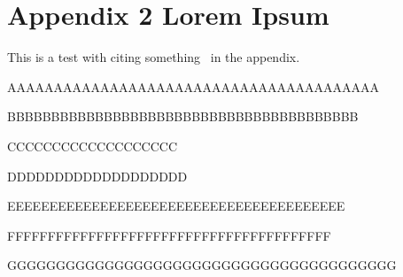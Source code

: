
%


\chapter{Appendix 2 Lorem Ipsum}
\label{app:lorem_ipsum2}

This is a test with citing something~\cite{ecoop12-dias} in the appendix.


AAAAAAAAAAAAAAAAAAAAAAAAAAAAAAAAAAAAAAAA

\lipsum[1-9]

BBBBBBBBBBBBBBBBBBBBBBBBBBBBBBBBBBBBBBBB


CCCCCCCCCCCCCCCCCCC

\lipsum[1-2]

DDDDDDDDDDDDDDDDDDD

\restorestocksize

EEEEEEEEEEEEEEEEEEEEEEEEEEEEEEEEEEEEEEEE

\lipsum[1-9]

FFFFFFFFFFFFFFFFFFFFFFFFFFFFFFFFFFFFFFFF

\restorestocksize

GGGGGGGGGGGGGGGGGGGGGGGGGGGGGGGGGGGGGGGG

\lipsum[1-10]
